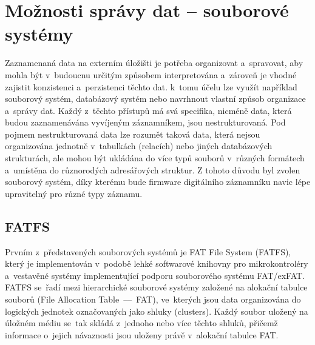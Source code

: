 



\section{Možnosti správy dat -- souborové systémy}
Zaznamenaná data na externím úložišti je potřeba organizovat a~spravovat, aby mohla být v~budoucnu určitým způsobem interpretována a~zároveň je vhodné zajistit konzistenci a~perzistenci těchto dat. k~tomu účelu lze využít například souborový systém, databázový systém nebo navrhnout vlastní způsob organizace a~správy dat. Každý z~těchto přístupů má svá specifika, nicméně data, která budou zaznamenávána vyvíjeným záznamníkem, jsou nestrukturovaná. Pod pojmem nestrukturovaná data lze rozumět taková data, která nejsou organizována jednotně v~tabulkách (relacích) nebo jiných databázových strukturách, ale mohou být ukládána do více typů souborů v~různých formátech a~umístěna do různorodých adresářových struktur. Z tohoto důvodu byl zvolen souborový systém, díky kterému bude firmware digitálního záznamníku navic lépe upravitelný pro různé typy záznamu.~\cite{weka_structured_unstructured_data, virginia_tech_file_database_systems}

\subsection{FATFS}
\label{fatfs}
Prvním z~představených souborových systémů je FAT File System (FATFS), který je implementován v~podobě lehké softwarové knihovny pro mikrokontroléry a~vestavěné systémy implementující podporu souborového systému FAT/exFAT. FATFS se~řadí mezi hierarchické souborové systémy založené na alokační tabulce souborů (File Allocation Table~––~FAT), ve~kterých jsou data organizována do logických jednotek označovaných jako shluky (clusters). Každý soubor uložený na úložném médiu se~tak skládá z~jednoho nebo více těchto shluků, přičemž informace o~jejich návaznosti jsou uloženy právě v~alokační tabulce FAT.~\cite{elm_fat_filesystem_docs, recoverit_fat_filesystem}

